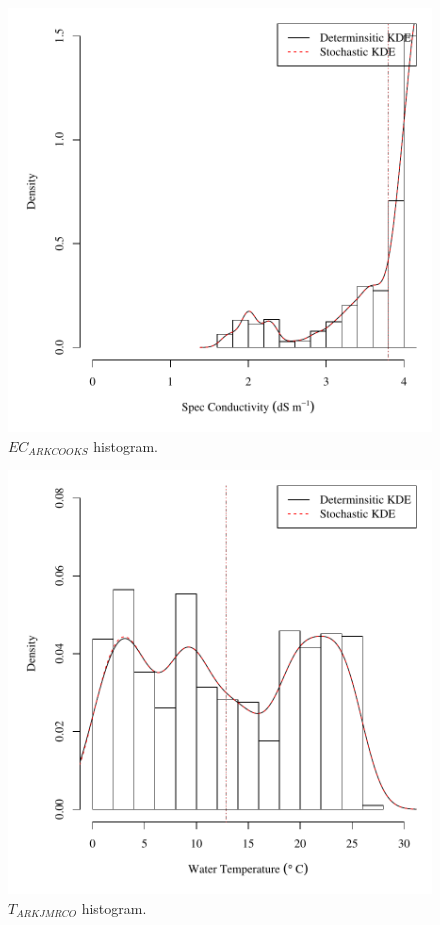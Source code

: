 \begin{center}
\begin{figure}[htbp]
	\includegraphics[width=6in]{"Figures/Results_DSR/V density ecout"}
	\caption{$EC_{ARKCOOKS}$ histogram.}
\end{figure}
\end{center}
\newpage

\begin{center}
\begin{figure}[htbp]
	\includegraphics[width=6in]{"Figures/Results_DSR/V density tin"}
	\caption{$T_{ARKJMRCO}$ histogram.}
\end{figure}
\end{center}
\newpage

